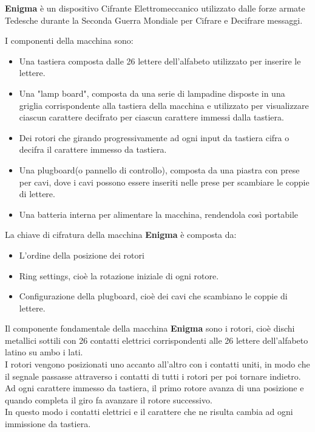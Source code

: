 \documentclass[
]{article}
\providecommand{\tightlist}{%
  \setlength{\itemsep}{0pt}\setlength{\parskip}{0pt}}
\begin{document}
\textbf{Enigma} è un dispositivo Cifrante Elettromeccanico utilizzato
dalle forze armate Tedesche durante la Seconda Guerra Mondiale per
Cifrare e Decifrare messaggi.

I componenti della macchina sono:

\begin{itemize}
\tightlist
\item
  Una tastiera composta dalle 26 lettere dell'alfabeto utilizzato per
  inserire le lettere.
\item
  Una "lamp board", composta da una serie di lampadine disposte in una
  griglia corrispondente alla tastiera della macchina e utilizzato per
  visualizzare ciascun carattere decifrato per ciascun carattere immessi
  dalla tastiera.
\item
  Dei rotori che girando progressivamente ad ogni input da tastiera
  cifra o decifra il carattere immesso da tastiera.
\item
  Una plugboard(o pannello di controllo), composta da una piastra con
  prese per cavi, dove i cavi possono essere inseriti nelle prese per
  scambiare le coppie di lettere.
\item
  Una batteria interna per alimentare la macchina, rendendola così
  portabile
\end{itemize}

La chiave di cifratura della macchina \textbf{Enigma} è composta da:

\begin{itemize}
\tightlist
\item
  L'ordine della posizione dei rotori
\item
  Ring settings, cioè la rotazione iniziale di ogni rotore.
\item
  Configurazione della plugboard, cioè dei cavi che scambiano le coppie
  di lettere.
\end{itemize}

Il componente fondamentale della macchina \textbf{Enigma} sono i rotori,
cioè dischi metallici sottili con 26 contatti elettrici corrispondenti
alle 26 lettere dell'alfabeto latino su ambo i lati.\\
I rotori vengono posizionati uno accanto all'altro con i contatti uniti,
in modo che il segnale passasse attraverso i contatti di tutti i rotori
per poi tornare indietro.\\
Ad ogni carattere immesso da tastiera, il primo rotore avanza di una
posizione e quando completa il giro fa avanzare il rotore successivo.\\
In questo modo i contatti elettrici e il carattere che ne risulta cambia
ad ogni immissione da tastiera.
\end{document}
